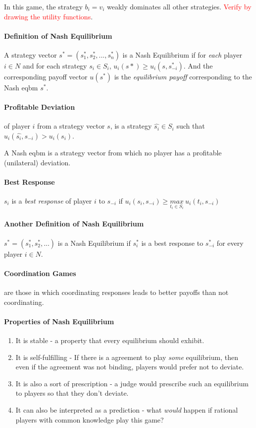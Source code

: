 In this game, the strategy $b_i = v_i$ weakly dominates all other strategies. \textcolor{red}{Verify by drawing the utility functions}.

\paragraph{Definition of Nash Equilibrium} A strategy vector $s^* = (s_1^*, s_2^*, ..., s_n^*)$ is a Nash Equilibrium if for \textit{each} player $i \in N$ and for each strategy $s_i \in S_i$, $u_i(s*) \geq u_i(s, s_{-i}^*)$. And the corresponding payoff vector $u(s^*)$ is the \textit{equilibrium payoff }corresponding to the Nash eqbm $s^*$.

\paragraph{Profitable Deviation} of player $i$ from a strategy vector $s$, is a strategy $\hat{s_i} \in S_i$ such that $u_i(\hat{s_i}, s_{-i}) > u_i(s_i)$.

A Nash eqbm is a strategy vector from which no player has a profitable (unilateral) deviation.

\paragraph{Best Response} $s_i$ is a \textit{best response} of player $i$ to $s_{-i}$ if $u_i(s_i, s_{-i}) \geq \underset{t_i \in S_i}{max}~u_i(t_i, s_{-i})$

\paragraph{Another Definition of Nash Equilibrium} $s^* = (s_1^*, s_2^*, ...)$ is a Nash Equilibrium if $s_i^*$ is a best response to $s_{-i}^*$ for every player $i \in N$.

\paragraph{Coordination Games} are those in which coordinating responses leads to better payoffs than not coordinating.

\paragraph{Properties of Nash Equilibrium}
\begin{enumerate}
	\item  It is stable - a property that every equilibrium should exhibit. 
	\item  It is self-fulfilling - If there is a agreement to play \textit{some} equilibrium, then even if the agreement was not binding, players would prefer not to deviate.
	\item It is also a sort of prescription - a judge would prescribe such an equilibrium to players so that they don't deviate. 
	\item  It can also be interpreted as a prediction - what \textit{would} happen if rational players with common knowledge play this game?
\end{enumerate}
